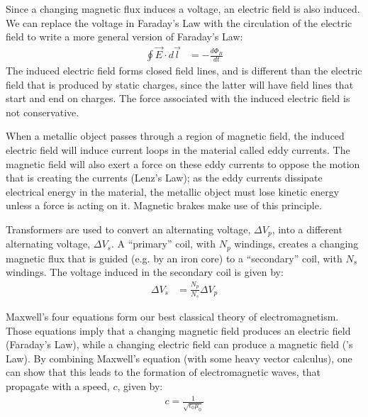 \begin{chapterSummary}
Since a changing magnetic flux induces a voltage, an electric field is also induced. We can replace the voltage in Faraday's Law with the circulation of the electric field to write a more general version of Faraday's Law:
\begin{align*}
\oint \vec E\cdot d\vec l &= -\frac{d\Phi_B}{dt}
\end{align*}
The induced electric field forms closed field lines, and is different than the electric field that is produced by static charges, since the latter will have field lines that start and end on charges. The force associated with the induced electric field is not conservative.

When a metallic object passes through a region of magnetic field, the induced electric field will induce current loops in the material called eddy currents. The magnetic field will also exert a force on these eddy currents to oppose the motion that is creating the currents (Lenz's Law); as the eddy currents dissipate electrical energy in the material, the metallic object must lose kinetic energy unless a force is acting on it. Magnetic brakes make use of this principle.

Transformers are used to convert an alternating voltage, $\Delta V_p$, into a different alternating voltage, $\Delta V_s$. A ``primary'' coil, with $N_p$ windings, creates a changing magnetic flux that is guided (e.g. by an iron core) to a ``secondary'' coil, with $N_s$ windings. The voltage induced in the secondary coil is given by:
\begin{align*}
\Delta V_s &= \frac{N_p}{N_s}\Delta V_p
\end{align*}

Maxwell's four equations form our best classical theory of electromagnetism. Those equations imply that a changing magnetic field produces an electric field (Faraday's Law), while a changing electric field can produce a magnetic field (\ampere's Law). By combining Maxwell's equation (with some heavy vector calculus), one can show that this leads to the formation of electromagnetic waves, that propagate with a speed, $c$, given by:
\begin{align*}
c = \frac{1}{\sqrt{\epsilon_0\mu_0}}
\end{align*}

\end{chapterSummary}

